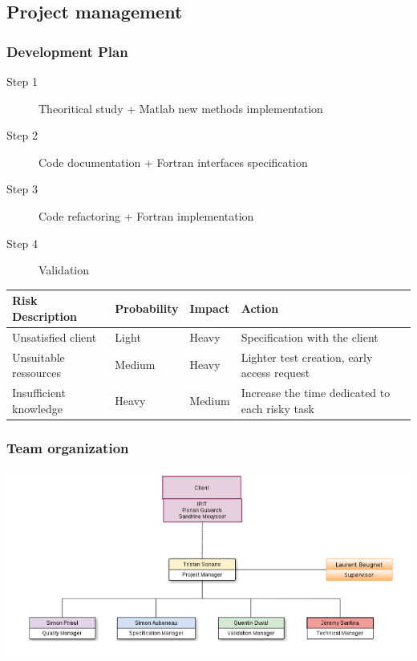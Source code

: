 \documentclass[10p]{beamer}
\begin{document}
\subsection{Project management}
\begin{frame}
\small
\frametitle{Development Plan}
\begin{description}
\item [Step 1] Theoritical study + Matlab new methods implementation
\item [Step 2] Code documentation + Fortran interfaces specification
\item [Step 3] Code refactoring + Fortran implementation
\item [Step 4] Validation
\end{description}
\tiny
\begin{tabular}{|l|l|l|l|}
\hline
\textbf{Risk Description} & \textbf{Probability} & \textbf{Impact} & \textbf{Action}
\\
\hline
Unsatisfied client & Light & Heavy & Specification with the client
\\
\hline
Unsuitable ressources & Medium & Heavy & Lighter test creation, early access request
\\
\hline
Insufficient knowledge & Heavy & Medium & Increase the time dedicated to each risky task
\\
\hline
\end{tabular}
\end{frame}
\begin{frame}
\frametitle{Team organization}
\includegraphics[width=\textwidth]{Image/organisation.png}
\end{frame}
\end{document}
